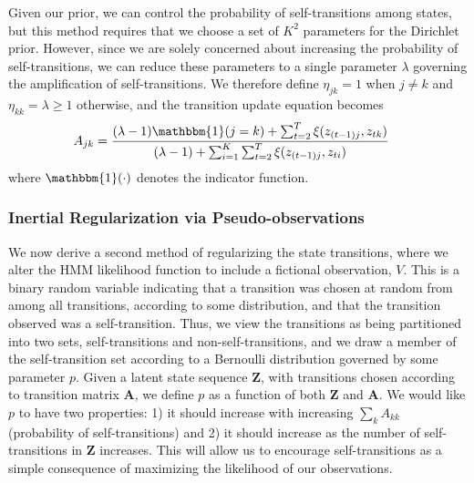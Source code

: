\documentclass[letterpaper]{article}
\begin{document}
Given our prior, we can control the probability of self-transitions among states, but this method requires that we choose a set of $K^2$ parameters for the Dirichlet prior. However, since we are solely concerned about increasing the probability of self-transitions, we can reduce these parameters to a single parameter $\lambda$ governing the amplification of self-transitions. We therefore define $\eta_{jk} = 1$ when $j\not=k$ and $\eta_{kk}= \lambda \geq 1$ otherwise, and the transition update equation becomes
\begin{align}\label{eq:MAP-final}
    A_{jk} &= \frac{(\lambda - 1){\mathbbm{1}(j = k)} + \sum_{t=2}^{T} \xi(z_{(t-1)j}, z_{tk})}   
    {(\lambda - 1) + \sum_{i=1}^{K}\sum_{t=2}^{T} \xi(z_{(t-1)j}, z_{ti})}
\end{align}
where $\mathbbm{1}(\cdot)$ denotes the indicator function.

\subsubsection{Inertial Regularization via Pseudo-observations}

We now derive a second method of regularizing the state transitions, where we alter the HMM likelihood function to include a fictional observation, $V$. This is a binary random variable indicating that a transition was chosen at random from among all transitions, according to some distribution, and that the transition observed was a self-transition. Thus, we view the transitions as being partitioned into two sets, self-transitions and non-self-transitions, and we draw a member of the self-transition set according to a Bernoulli distribution governed by some parameter $p$. Given a latent state sequence $\mathbf{Z}$, with transitions chosen according to transition matrix $\mathbf{A}$, we define $p$ as a function of both $\mathbf{Z}$ and $\mathbf{A}$. We would like $p$ to have two properties: 1) it should increase with increasing $\sum_k A_{kk}$ (probability of self-transitions) and 2) it should increase as the number of self-transitions in $\mathbf{Z}$ increases. This will allow us to encourage self-transitions as a simple consequence of maximizing the likelihood of our observations.
\end{document}
